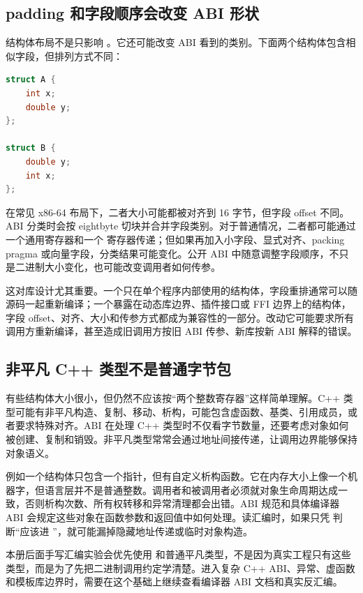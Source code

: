 \subsection{padding 和字段顺序会改变 ABI 形状}

结构体布局不是只影响 。它还可能改变 ABI 看到的类别。下面两个结构体包含相似字段，但排列方式不同：

\begin{lstlisting}[language=C++]
struct A {
    int x;
    double y;
};

struct B {
    double y;
    int x;
};
\end{lstlisting}

在常见 x86-64 布局下，二者大小可能都被对齐到 16 字节，但字段 offset 不同。ABI 分类时会按 eightbyte 切块并合并字段类别。对于普通情况，二者都可能通过一个通用寄存器和一个  寄存器传递；但如果再加入小字段、显式对齐、packing pragma 或向量字段，分类结果可能变化。公开 ABI 中随意调整字段顺序，不只是二进制大小变化，也可能改变调用者如何传参。

这对库设计尤其重要。一个只在单个程序内部使用的结构体，字段重排通常可以随源码一起重新编译；一个暴露在动态库边界、插件接口或 FFI 边界上的结构体，字段 offset、对齐、大小和传参方式都成为兼容性的一部分。改动它可能要求所有调用方重新编译，甚至造成旧调用方按旧 ABI 传参、新库按新 ABI 解释的错误。

\subsection{非平凡 C++ 类型不是普通字节包}

有些结构体大小很小，但仍然不应该按“两个整数寄存器”这样简单理解。C++ 类型可能有非平凡构造、复制、移动、析构，可能包含虚函数、基类、引用成员，或者要求特殊对齐。ABI 在处理 C++ 类型时不仅看字节数量，还要考虑对象如何被创建、复制和销毁。非平凡类型常常会通过地址间接传递，让调用边界能够保持对象语义。

例如一个结构体只包含一个指针，但有自定义析构函数。它在内存大小上像一个机器字，但语言层并不是普通整数。调用者和被调用者必须就对象生命周期达成一致，否则析构次数、所有权转移和异常清理都会出错。ABI 规范和具体编译器 ABI 会规定这些对象在函数参数和返回值中如何处理。读汇编时，如果只凭  判断“应该进 ”，就可能漏掉隐藏地址传递或临时对象构造。

本册后面手写汇编实验会优先使用  和普通平凡类型，不是因为真实工程只有这些类型，而是为了先把二进制调用约定学清楚。进入复杂 C++ ABI、异常、虚函数和模板库边界时，需要在这个基础上继续查看编译器 ABI 文档和真实反汇编。

